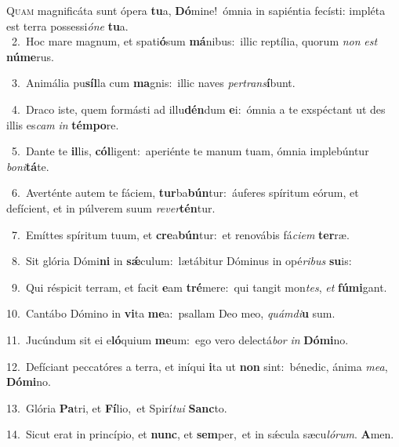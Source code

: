 \lettrine{\initial\textcolor{\initialcolor}{Q}}{uam} magnificáta sunt ópera \textbf{tu}\-a, \textbf{Dó}\-mine!~\star ómnia in sapiéntia fecísti: impléta est terra possessi\-\textit{ó}\-\textit{ne} \textbf{tu}\-a.\\
{\numbfont\textcolor{\numbcolor}{~2.}}~Hoc mare magnum, et spati\-\textbf{ó}\-sum \textbf{má}\-nibus:~\star illic reptília, quorum \textit{non} \textit{est} \textbf{nú}\-\textbf{me}rus.\par
{\numbfont\textcolor{\numbcolor}{~3.}}~Animália pu\-\textbf{síl}\-la cum \textbf{ma}\-gnis:~\star illic naves \textit{per}\-\textit{trans}\textbf{í}bunt.\par
{\numbfont\textcolor{\numbcolor}{~4.}}~Draco iste, quem formásti ad illu\-\textbf{dén}\-dum \textbf{e}\-i:~\star ómnia a te exspéctant ut des illis es\textit{cam} \textit{in} \textbf{tém}\-\textbf{po}re.\par
{\numbfont\textcolor{\numbcolor}{~5.}}~Dante te \textbf{il}\-lis, \textbf{cól}\-ligent:~\star aperiénte te manum tuam, ómnia implebúntur \textit{bo}\-\textit{ni}\textbf{tá}te.\par
{\numbfont\textcolor{\numbcolor}{~6.}}~Averténte autem te fáciem, \textbf{tur}\-ba\-\textbf{bún}\-tur:~\star áuferes spíritum eórum, et defícient, et in púlverem suum \textit{re}\-\textit{ver}\textbf{tén}tur.\par
{\numbfont\textcolor{\numbcolor}{~7.}}~Emíttes spíritum tuum, et \textbf{cre}\-a\-\textbf{bún}\-tur:~\star et renovábis fá\-\textit{ci}\-\textit{em} \textbf{ter}\-ræ.\par
{\numbfont\textcolor{\numbcolor}{~8.}}~Sit glória Dómi\textbf{ni} in \textbf{sǽ}\-culum:~\star lætábitur Dóminus in opé\-\textit{ri}\-\textit{bus} \textbf{su}\-is:\par
{\numbfont\textcolor{\numbcolor}{~9.}}~Qui réspicit terram, et facit \textbf{e}\-am \textbf{tré}\-mere:~\star qui tangit mon\-\textit{tes}\-, \textit{et} \textbf{fú}\-\textbf{mi}gant.\par
{\numbfont\textcolor{\numbcolor}{10.}}~Cantábo Dómino in \textbf{vi}\-ta \textbf{me}\-a:~\star psallam Deo meo, \textit{quám}\-\textit{di}\textbf{u} sum.\par
{\numbfont\textcolor{\numbcolor}{11.}}~Jucúndum sit ei e\-\textbf{ló}\-quium \textbf{me}\-um:~\star ego vero delectá\textit{bor} \textit{in} \textbf{Dó}\-\textbf{mi}no.\par
{\numbfont\textcolor{\numbcolor}{12.}}~Defíciant peccatóres a terra, et iníqui \textbf{i}\-ta ut \textbf{non} sint:~\star bénedic, ánima \textit{me}\-\textit{a}, \textbf{Dó}\-\textbf{mi}no.\par
{\numbfont\textcolor{\numbcolor}{13.}}~Glória \textbf{Pa}\-tri, et \textbf{Fí}\-lio,~\star et Spirí\-\textit{tu}\-\textit{i} \textbf{Sanc}\-to.\par
{\numbfont\textcolor{\numbcolor}{14.}}~Sicut erat in princípio, et \textbf{nunc}\-, et \textbf{sem}\-per,~\star et in sǽcula sæcu\-\textit{ló}\-\textit{rum}. \textbf{A}\-men.\par
